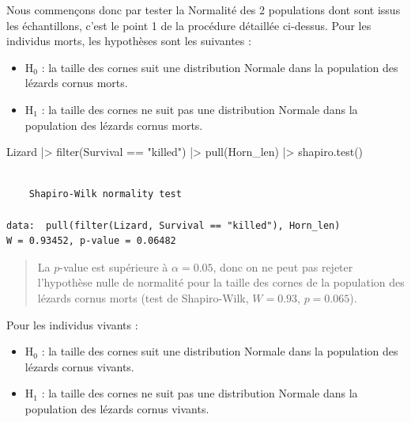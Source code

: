 \documentclass[
  french,
  a4paper,
  DIV=11,
  numbers=noendperiod,
  oneside]{scrreprt}
\newenvironment{Shaded}{}{}
\newcommand{\FunctionTok}[1]{\textcolor[rgb]{0.44,0.26,0.76}{#1}}
\newcommand{\NormalTok}[1]{\textcolor[rgb]{0.14,0.16,0.18}{#1}}
\newcommand{\SpecialCharTok}[1]{\textcolor[rgb]{0.00,0.36,0.77}{#1}}
\newcommand{\StringTok}[1]{\textcolor[rgb]{0.01,0.18,0.38}{#1}}
\providecommand{\tightlist}{%
  \setlength{\itemsep}{0pt}\setlength{\parskip}{0pt}}
\begin{document}
Nous commençons donc par tester la Normalité des 2 populations dont sont
issus les échantillons, c'est le point 1 de la procédure détaillée
ci-dessus. Pour les individus morts, les hypothèses sont les suivantes :

\begin{itemize}
\tightlist
\item
  H\(_0\) : la taille des cornes suit une distribution Normale dans la
  population des lézards cornus morts.
\item
  H\(_1\) : la taille des cornes ne suit pas une distribution Normale
  dans la population des lézards cornus morts.
\end{itemize}

\begin{Shaded}
\begin{Highlighting}[]
\NormalTok{Lizard }\SpecialCharTok{|\textgreater{}}
  \FunctionTok{filter}\NormalTok{(Survival }\SpecialCharTok{==} \StringTok{"killed"}\NormalTok{) }\SpecialCharTok{|\textgreater{}}
  \FunctionTok{pull}\NormalTok{(Horn\_len) }\SpecialCharTok{|\textgreater{}}
  \FunctionTok{shapiro.test}\NormalTok{()}
\end{Highlighting}
\end{Shaded}

\begin{verbatim}

    Shapiro-Wilk normality test

data:  pull(filter(Lizard, Survival == "killed"), Horn_len)
W = 0.93452, p-value = 0.06482
\end{verbatim}

\begin{quote}
La \(p\)-value est supérieure à \(\alpha = 0.05\), donc on ne peut pas
rejeter l'hypothèse nulle de normalité pour la taille des cornes de la
population des lézards cornus morts (test de Shapiro-Wilk, \(W = 0.93\),
\(p = 0.065\)).
\end{quote}

Pour les individus vivants :

\begin{itemize}
\tightlist
\item
  H\(_0\) : la taille des cornes suit une distribution Normale dans la
  population des lézards cornus vivants.
\item
  H\(_1\) : la taille des cornes ne suit pas une distribution Normale
  dans la population des lézards cornus vivants.
\end{itemize}
\end{document}
